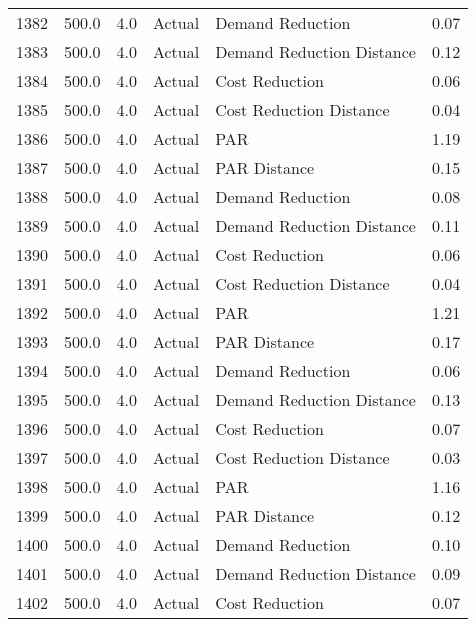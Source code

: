 \begin{longtable}{lrrllr}
1382 &        500.0 &     4.0 &         Actual &           Demand Reduction &   0.07 \\
1383 &        500.0 &     4.0 &         Actual &  Demand Reduction Distance &   0.12 \\
1384 &        500.0 &     4.0 &         Actual &             Cost Reduction &   0.06 \\
1385 &        500.0 &     4.0 &         Actual &    Cost Reduction Distance &   0.04 \\
1386 &        500.0 &     4.0 &         Actual &                        PAR &   1.19 \\
1387 &        500.0 &     4.0 &         Actual &               PAR Distance &   0.15 \\
1388 &        500.0 &     4.0 &         Actual &           Demand Reduction &   0.08 \\
1389 &        500.0 &     4.0 &         Actual &  Demand Reduction Distance &   0.11 \\
1390 &        500.0 &     4.0 &         Actual &             Cost Reduction &   0.06 \\
1391 &        500.0 &     4.0 &         Actual &    Cost Reduction Distance &   0.04 \\
1392 &        500.0 &     4.0 &         Actual &                        PAR &   1.21 \\
1393 &        500.0 &     4.0 &         Actual &               PAR Distance &   0.17 \\
1394 &        500.0 &     4.0 &         Actual &           Demand Reduction &   0.06 \\
1395 &        500.0 &     4.0 &         Actual &  Demand Reduction Distance &   0.13 \\
1396 &        500.0 &     4.0 &         Actual &             Cost Reduction &   0.07 \\
1397 &        500.0 &     4.0 &         Actual &    Cost Reduction Distance &   0.03 \\
1398 &        500.0 &     4.0 &         Actual &                        PAR &   1.16 \\
1399 &        500.0 &     4.0 &         Actual &               PAR Distance &   0.12 \\
1400 &        500.0 &     4.0 &         Actual &           Demand Reduction &   0.10 \\
1401 &        500.0 &     4.0 &         Actual &  Demand Reduction Distance &   0.09 \\
1402 &        500.0 &     4.0 &         Actual &             Cost Reduction &   0.07 \\

\end{longtable}

